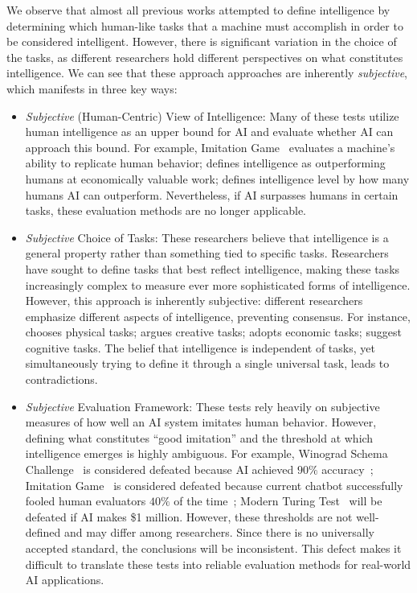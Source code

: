 We observe that almost all previous works attempted to define intelligence by determining which human-like tasks that a machine must accomplish in order to be considered intelligent. However, there is significant variation in the choice of the tasks, as different researchers hold different perspectives on what constitutes intelligence. We can see that these approach approaches are inherently \textit{subjective}, which manifests in three key ways:
\begin{itemize}
	\item \textit{Subjective} (Human-Centric) View of Intelligence: Many of these tests utilize human intelligence as an upper bound for AI and evaluate whether AI can approach this bound. For example, Imitation Game~\citep{turing1950computing} evaluates a machine’s ability to replicate human behavior; \cite{openAICharter} defines intelligence as outperforming humans at economically valuable work; \cite{morris2024levels} defines intelligence level by how many humans AI can outperform. Nevertheless, if AI surpasses humans in certain tasks, these evaluation methods are no longer applicable. 
	\item \textit{Subjective} Choice of Tasks: These researchers believe that intelligence is a general property rather than something tied to specific tasks. Researchers have sought to define tasks that best reflect intelligence, making these tasks increasingly complex to measure ever more sophisticated forms of intelligence. However, this approach is inherently subjective: different researchers emphasize different aspects of intelligence, preventing consensus. For instance, \citet{harnad1991other} chooses physical tasks; \citet{bringsjord2003creativity} argues creative tasks; \citet{suleyman2023coming} adopts economic tasks; \citet{morris2024levels} suggest cognitive tasks. The belief that intelligence is independent of tasks, yet simultaneously trying to define it through a single universal task, leads to contradictions.
	\item \textit{Subjective} Evaluation Framework: These tests rely heavily on subjective measures of how well an AI system imitates human behavior. However, defining what constitutes ``good imitation'' and the threshold at which intelligence emerges is highly ambiguous. For example, Winograd Schema Challenge~\citep{levesque2012winograd} is considered defeated because AI achieved $90\%$ accuracy~\citep{kocijan2023defeat}; Imitation Game~\citep{turing1950computing} is considered defeated because current chatbot successfully fooled human evaluators $40\%$ of the time~\citep{biever2023chatgpt}; Modern Turing Test~\citep{suleyman2023coming} will be defeated if AI makes \$1 million. However, these thresholds are not well-defined and may differ among researchers. Since there is no universally accepted standard, the conclusions will be inconsistent. This defect makes it difficult to translate these tests into reliable evaluation methods for real-world AI applications.
\end{itemize}

